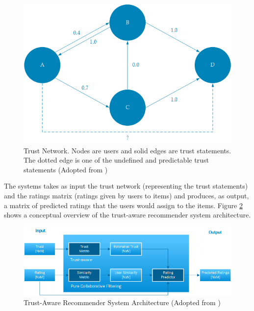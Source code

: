 \begin{figure}[H]
    \includegraphics[width=5in]{image/webofTrust.png}
    \centering
    \caption[Trust Network]{Trust Network. Nodes are users and solid edges are trust statements. The dotted edge is one of the undefined and predictable trust statements (Adopted from \cite{Massa2004})}
    \label{figure:weboftrust}
\end{figure}

The systems takes as input the trust network (representing the trust
statements) and the ratings matrix (ratings given by users to items) and
produces, as output, a matrix of predicted ratings that the users would assign
to the items. Figure \ref{figure:trustarchictecture} shows a conceptual
overview of the trust-aware recommender system architecture.

\begin{figure}[H]
    \includegraphics[width=5in]{image/trustawarearchitecture.png}
    \centering
    \caption[Trust-Aware Recommender System Architecture]{Trust-Aware
    Recommender System Architecture (Adopted from \cite{Massa2004})}
    \label{figure:trustarchictecture}
\end{figure}


